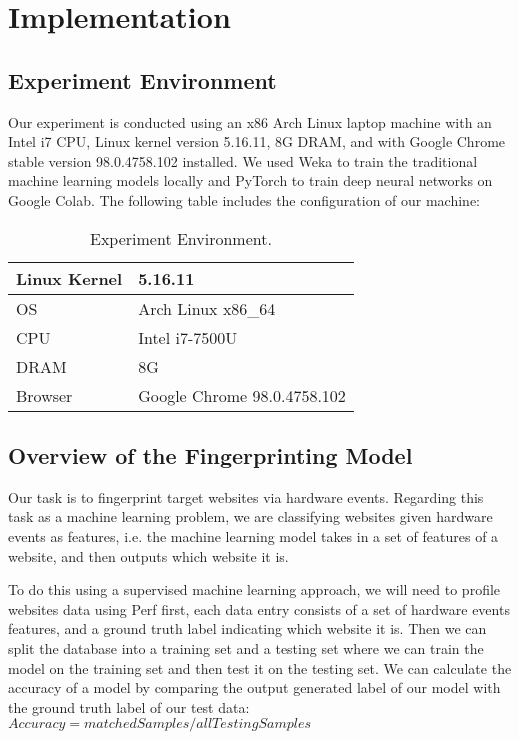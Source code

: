 \documentclass[conference]{IEEEtran}
\begin{document}
\section{Implementation}
\subsection{Experiment Environment}
Our experiment is conducted using an x86 Arch Linux laptop machine with an Intel i7 CPU, Linux kernel version 5.16.11, 8G DRAM, and with Google Chrome stable version 98.0.4758.102 installed. We used Weka to train the traditional machine learning models locally and PyTorch to train deep neural networks on Google Colab. The following table includes the configuration of our machine:
\begin{table}[h!]
    \caption{Experiment Environment.\label{table}}
    \centering
    \begin{tabular}{ | m{6em} | m{5cm}| }
      \hline
      Linux Kernel & 5.16.11 \\ 
      \hline
      OS & Arch Linux x86\_64 \\ 
      \hline
      CPU & Intel i7-7500U \\ 
      \hline
      DRAM & 8G \\
      \hline
      Browser & Google Chrome 98.0.4758.102 \\
      \hline
    \end{tabular}
\end{table}

\subsection{Overview of the Fingerprinting Model}
Our task is to fingerprint target websites via hardware events. Regarding this task as a machine learning problem, we are classifying websites given hardware events as features, i.e. the machine learning model takes in a set of features of a website, and then outputs which website it is.

To do this using a supervised machine learning approach, we will need to profile websites data using Perf\cite{b2} first, each data entry consists of a set of hardware events features, and a ground truth label indicating which website it is. Then we can split the database into a training set and a testing set where we can train the model on the training set and then test it on the testing set. We can calculate the accuracy of a model by comparing the output generated label of our model with the ground truth label of our test data: $Accuracy = matched Samples / all Testing Samples$
\end{document}
